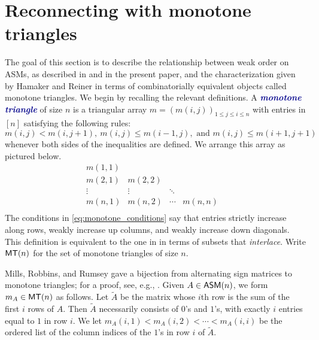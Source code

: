 \documentclass[12 pt]{amsart}
\newcommand{\newword}[1]{\textcolor{darkblue}{\textbf{\emph{#1}}}}
\numberwithin{equation}{section}
\theoremstyle{remark}
\newcommand{\asm}{{\sf ASM}}
\newcommand{\monotone}{{\sf MT}}
\begin{document}
\section{Reconnecting with monotone triangles}
\label{section:monotone_triangles}

The goal of this section is to describe the relationship between weak order on ASMs, as described in \cite{EKW-main} and in the present paper, and the characterization given by Hamaker and Reiner \cite{HR20} in terms of combinatorially equivalent objects called monotone triangles.  
We begin by recalling the relevant definitions.  
A \newword{monotone triangle} of size $n$ is a triangular array $m=(m(i,j))_{1 \leq j \leq i \leq n}$ with entries in $[n]$ satisfying the following rules:
\begin{equation}
\label{eq:monotone_conditions}
    m(i,j)<m(i,j+1),\ m(i,j)\leq m(i-1,j), \text{ and } m(i,j)\leq m(i+1,j+1)
\end{equation}
whenever both sides of the inequalities are defined.  
We arrange this array as pictured below.
\[
\begin{array}{ccccc}
m(1,1) &  &  &  & \\
m(2,1) & m(2,2) &   & & \\
 \vdots &  \vdots  &  \ddots  & & \\
m(n,1) & m(n,2)& \cdots & m(n,n) \\
\end{array}
\]
The conditions in \cref{eq:monotone_conditions} say that entries strictly increase along rows, weakly increase up columns, and weakly increase down diagonals.  This definition is equivalent to the one in \cite{HR20} in terms of subsets that \emph{interlace}. Write $\monotone(n)$ for the set of monotone triangles of size $n$.  

Mills, Robbins, and Rumsey \cite{MRR83} gave a bijection from alternating sign matrices to monotone triangles; for a proof, see, e.g., \cite[Proposition~3.4]{BSS}.  Given $A\in \asm(n)$, we form $m_A\in \monotone(n)$ as follows.  Let $\widetilde{A}$ be the matrix whose $i$th row is the sum of the first $i$ rows of $A$.  Then $\widetilde{A}$ necessarily consists of $0$'s and $1$'s, with exactly $i$ entries equal to $1$ in row $i$.  
We let $m_A(i,1)<m_A(i,2)<\cdots <m_A(i,i)$ be the ordered list of the column indices of the $1$'s in row $i$ of $\widetilde{A}$. 
\end{document}
